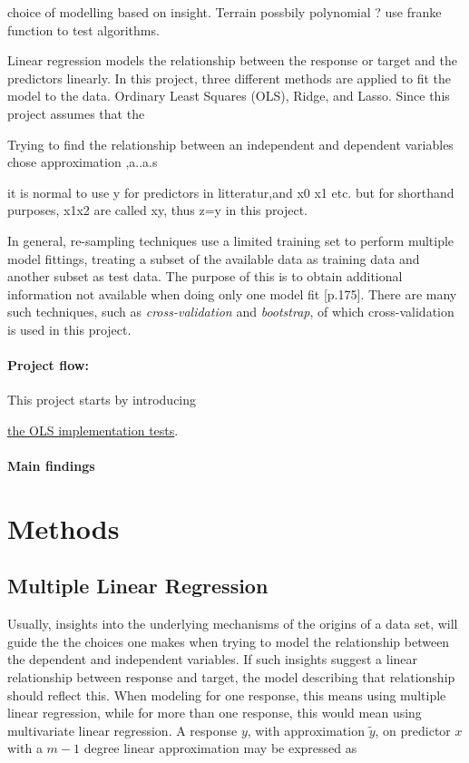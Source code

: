 \documentclass[%
oneside,                 %
final,                   %
10pt]{article}
\begin{document}
choice of modelling based on insight. Terrain possbily polynomial ? use franke function to test algorithms. 

Linear regression models the relationship between the response or target and the predictors linearly. In this project, three different methods are applied to fit the model to the data. Ordinary Least Squares (OLS), Ridge, and Lasso. Since this project assumes that the 

 Trying to find the relationship between an independent and dependent variables chose approximation ,a..a.s

it is normal to use y for predictors in litteratur,and x0 x1 etc. but for shorthand purposes, x1x2 are called xy, thus z=y in this project.

In general, re-sampling techniques use a limited training set to perform multiple model fittings, treating a subset of the available data as training data and another subset as test data. The purpose of this is to obtain additional information not available when doing only one model fit \citep{2017introstatlearn}[p.175]. There are many such techniques, such as \textit{cross-validation} and \textit{bootstrap}, of which cross-validation is used in this project.
\paragraph{Project flow:} This project starts by introducing 

\hyperref[S:Code_impl_init_ols]{the OLS implementation tests}.

\paragraph{Main findings}


\section{Methods}
\subsection{Multiple Linear Regression}
Usually, insights into the underlying mechanisms of the origins of a data set, will guide the the choices one makes when trying to model the relationship between the dependent and independent variables. If such insights suggest a linear relationship between response and target, the model describing that relationship should reflect this. When modeling for one response, this means using multiple linear regression, while for more than one response, this would mean using multivariate linear regression. A response $y$, with approximation $\tilde{y}$, on predictor $x$ with a $m-1$ degree linear approximation may be expressed as
\end{document}
